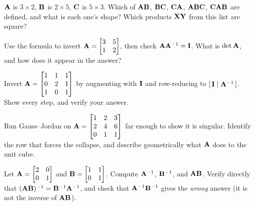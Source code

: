 \begin{exercise}[Shapes]
$\mathbf{A}$ is $3\times 2$, $\mathbf{B}$ is $2\times 5$, $\mathbf{C}$ is $5\times 3$. Which of
$\mathbf{A}\mathbf{B}$, $\mathbf{B}\mathbf{C}$, $\mathbf{C}\mathbf{A}$, $\mathbf{A}\mathbf{B}\mathbf{C}$,
$\mathbf{C}\mathbf{A}\mathbf{B}$ are defined, and what is each one's shape? Which products
$\mathbf{X}\mathbf{Y}$ from this list are square?
\end{exercise}

\begin{exercise}
Use the formula to invert $\mathbf{A} = \begin{bmatrix} 3 & 5 \\ 1 & 2 \end{bmatrix}$, then
check $\mathbf{A}\mathbf{A}^{-1} = \mathbf{I}$. What is $\det\mathbf{A}$, and how does it appear in the
answer?
\end{exercise}

\begin{exercise}
Invert $\mathbf{A} = \begin{bmatrix} 1 & 1 & 1 \\ 0 & 2 & 1 \\ 1 & 0 & 1 \end{bmatrix}$ by
augmenting with $\mathbf{I}$ and row-reducing to $[\,\mathbf{I}\mid\mathbf{A}^{-1}\,]$. Show every
step, and verify your answer.
\end{exercise}

\begin{exercise}
Run Gauss--Jordan on $\mathbf{A} = \begin{bmatrix} 1 & 2 & 3 \\ 2 & 4 & 6 \\ 0 & 1 & 1 \end{bmatrix}$ far enough to show it is singular. Identify the row that forces the
collapse, and describe geometrically what $\mathbf{A}$ does to the unit cube.
\end{exercise}

\begin{exercise}
Let $\mathbf{A} = \begin{bmatrix} 2 & 0 \\ 0 & 1 \end{bmatrix}$ and
$\mathbf{B} = \begin{bmatrix} 1 & 1 \\ 0 & 1 \end{bmatrix}$. Compute $\mathbf{A}^{-1}$,
$\mathbf{B}^{-1}$, and $\mathbf{A}\mathbf{B}$. Verify directly that $(\mathbf{A}\mathbf{B})^{-1} =
\mathbf{B}^{-1}\mathbf{A}^{-1}$, and check that $\mathbf{A}^{-1}\mathbf{B}^{-1}$ gives the \emph{wrong}
answer (it is not the inverse of $\mathbf{A}\mathbf{B}$).
\end{exercise}

